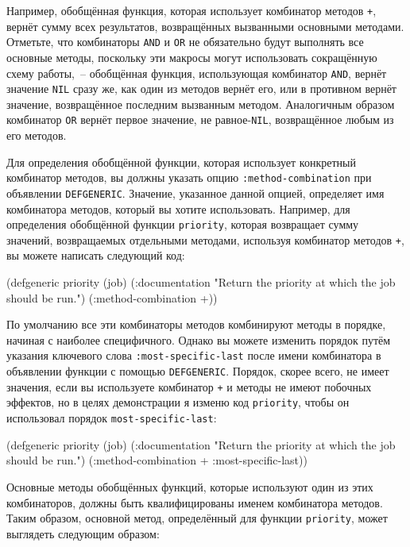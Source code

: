 Например, обобщённая функция, которая использует комбинатор методов \lstinline{+}, вернёт сумму
всех результатов, возвращённых вызванными основными методами.  Отметьте, что комбинаторы
\lstinline{AND} и \lstinline{OR} не обязательно будут выполнять все основные методы, поскольку эти
макросы могут использовать сокращённую схему работы,~-- обобщённая функция, использующая
комбинатор \lstinline{AND}, вернёт значение \lstinline{NIL} сразу же, как один из методов вернёт его,
или в противном вернёт значение, возвращённое последним вызванным методом.  Аналогичным
образом комбинатор \lstinline{OR} вернёт первое значение, не равное-\lstinline{NIL}, возвращённое
любым из его методов.

Для определения обобщённой функции, которая использует конкретный комбинатор методов, вы
должны указать опцию \lstinline{:method-combination} при объявлении \lstinline{DEFGENERIC}.
Значение, указанное данной опцией, определяет имя комбинатора методов, который вы хотите
использовать.  Например, для определения обобщённой функции \lstinline{priority}, которая
возвращает сумму значений, возвращаемых отдельными методами, используя комбинатор методов
\lstinline{+}, вы можете написать следующий код:

\begin{myverb}
(defgeneric priority (job)
  (:documentation "Return the priority at which the job should be run.")
  (:method-combination +))
\end{myverb}

По умолчанию все эти комбинаторы методов комбинируют методы в порядке, начиная с наиболее
специфичного.  Однако вы можете изменить порядок путём указания ключевого слова
\lstinline{:most-specific-last} после имени комбинатора в объявлении функции с помощью
\lstinline{DEFGENERIC}.  Порядок, скорее всего, не имеет значения, если вы используете комбинатор
\lstinline{+} и методы не имеют побочных эффектов, но в целях демонстрации я изменю код
\lstinline{priority}, чтобы он использовал порядок \lstinline{most-specific-last}:

\begin{myverb}
(defgeneric priority (job)
  (:documentation "Return the priority at which the job should be run.")
  (:method-combination + :most-specific-last))
\end{myverb}

Основные методы обобщённых функций, которые используют один из этих комбинаторов, должны
быть квалифицированы именем комбинатора методов.  Таким образом, основной метод,
определённый для функции \lstinline{priority}, может выглядеть следующим образом:

